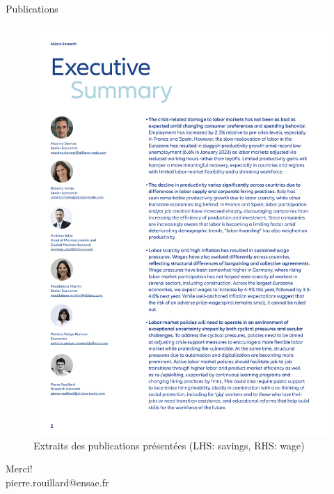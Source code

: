 \documentclass[9pt, xcolor={dvipsnames}]{beamer}
\begin{document}
\begin{frame}{Publications}
\begin{figure}
\begin{columns}[c]
\begin{column}{0.3\textwidth}
      \includegraphics[width=1.3\textwidth]{img/az2.png}
    \end{column}
    \end{columns}
    \caption{Extraits des publications présentées (LHS: savings, RHS: wage)}
  \end{figure}
  \end{frame}

\begin{frame}
 \begin{center}
		{\Huge Merci!}\\
		\bigskip\bigskip %
		{\LARGE pierre.rouillard@ensae.fr}
	\end{center}
\end{frame}
\end{document}
